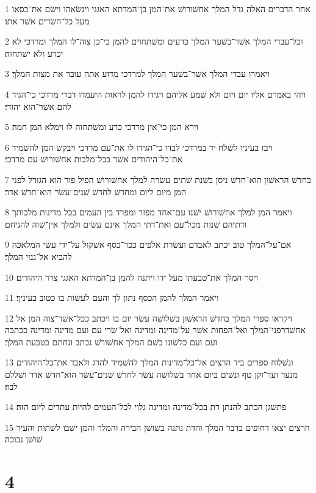 \par 1 אחר הדברים האלה גדל המלך אחשׁורושׁ את־המן בן־המדתא האגגי וינשׂאהו וישׂם את־כסאו מעל כל־השׂרים אשׁר אתו׃
\par 2 וכל־עבדי המלך אשׁר־בשׁער המלך כרעים ומשׁתחוים להמן כי־כן צוה־לו המלך ומרדכי לא יכרע ולא ישׁתחוה׃
\par 3 ויאמרו עבדי המלך אשׁר־בשׁער המלך למרדכי מדוע אתה עובר את מצות המלך׃
\par 4 ויהי באמרם אליו יום ויום ולא שׁמע אליהם ויגידו להמן לראות היעמדו דברי מרדכי כי־הגיד להם אשׁר־הוא יהודי׃
\par 5 וירא המן כי־אין מרדכי כרע ומשׁתחוה לו וימלא המן חמה׃
\par 6 ויבז בעיניו לשׁלח יד במרדכי לבדו כי־הגידו לו את־עם מרדכי ויבקשׁ המן להשׁמיד את־כל־היהודים אשׁר בכל־מלכות אחשׁורושׁ עם מרדכי׃
\par 7 בחדשׁ הראשׁון הוא־חדשׁ ניסן בשׁנת שׁתים עשׂרה למלך אחשׁורושׁ הפיל פור הוא הגורל לפני המן מיום ליום ומחדשׁ לחדשׁ שׁנים־עשׂר הוא־חדשׁ אדר׃
\par 8 ויאמר המן למלך אחשׁורושׁ ישׁנו עם־אחד מפזר ומפרד בין העמים בכל מדינות מלכותך ודתיהם שׁנות מכל־עם ואת־דתי המלך אינם עשׂים ולמלך אין־שׁוה להניחם׃
\par 9 אם־על־המלך טוב יכתב לאבדם ועשׂרת אלפים ככר־כסף אשׁקול על־ידי עשׂי המלאכה להביא אל־גנזי המלך׃
\par 10 ויסר המלך את־טבעתו מעל ידו ויתנה להמן בן־המדתא האגגי צרר היהודים׃
\par 11 ויאמר המלך להמן הכסף נתון לך והעם לעשׂות בו כטוב בעיניך׃
\par 12 ויקראו ספרי המלך בחדשׁ הראשׁון בשׁלושׁה עשׂר יום בו ויכתב ככל־אשׁר־צוה המן אל אחשׁדרפני־המלך ואל־הפחות אשׁר על־מדינה ומדינה ואל־שׂרי עם ועם מדינה ומדינה ככתבה ועם ועם כלשׁונו בשׁם המלך אחשׁורשׁ נכתב ונחתם בטבעת המלך׃
\par 13 ונשׁלוח ספרים ביד הרצים אל־כל־מדינות המלך להשׁמיד להרג ולאבד את־כל־היהודים מנער ועד־זקן טף ונשׁים ביום אחד בשׁלושׁה עשׂר לחדשׁ שׁנים־עשׂר הוא־חדשׁ אדר ושׁללם לבוז׃
\par 14 פתשׁגן הכתב להנתן דת בכל־מדינה ומדינה גלוי לכל־העמים להיות עתדים ליום הזה׃
\par 15 הרצים יצאו דחופים בדבר המלך והדת נתנה בשׁושׁן הבירה והמלך והמן ישׁבו לשׁתות והעיר שׁושׁן נבוכה׃

\chapter{4}

